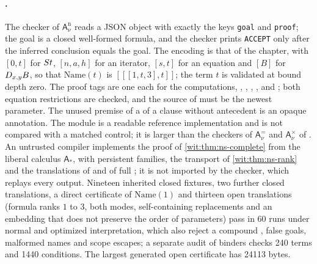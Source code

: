 \paragraph{.}
The checker of $\mathsf{A}^{\mathrm n}_{\nu}$ reads a JSON object with
exactly the keys \texttt{goal} and \texttt{proof}; the goal is a closed
well-formed formula, and the checker prints \texttt{ACCEPT} only after the
inferred conclusion equals the goal.  The encoding is that of the chapter,
with $[0,t]$ for $S t$, $[n,a,h]$ for an iterator, $[s,t]$ for an equation
and $[B]$ for $D_{x,y}B$, so that $\mathrm{Name}(t)$ is
$[[[1,t,3],t]]$; the term $t$ is validated at bound depth zero.  The proof
tags are one each for the computations, , ,
, ,  and ;
both equation restrictions are checked, and the source of 
must be the newest parameter.  The unused premise of a  of a
clause without antecedent is an opaque annotation.  The module is a
readable reference implementation and is not compared with a matched
control; it is larger than the checkers of $\mathsf{A}^{=}_{\nu}$ and
$\mathsf{A}^{\times}_{\nu}$ of .  An untrusted
compiler implements the proof of \cref{wit:thm:ns-complete} from the liberal
calculus $\mathsf{A}_{\ast}$, with persistent families, the transport of
\cref{wit:thm:ns-rank} and the translations of  and of full
; it is not imported by the checker, which replays every
output.  Nineteen inherited closed fixtures, two further closed translations,
a direct certificate of $\mathrm{Name}(1)$ and thirteen open translations
(formula ranks $1$ to $3$, both modes, self-containing 
replacements and an embedding that does not preserve the order of
parameters) pass in 60 runs under normal and optimized interpretation,
which also reject a compound , false goals, malformed names
and scope escapes; a separate audit of binders checks 240 terms and 1440
conditions.  The largest generated open certificate has 24113 bytes.

